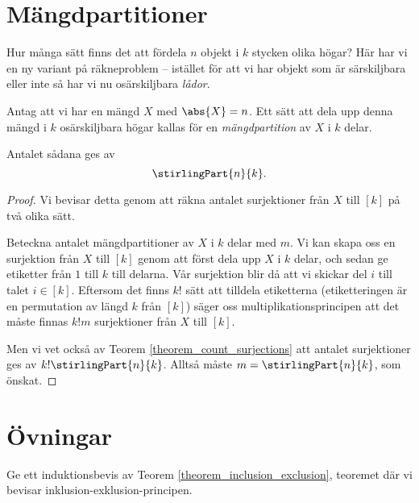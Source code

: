 \documentclass[nobib]{tufte-handout}
\begin{document}
\section{Mängdpartitioner}

Hur många sätt finns det att fördela $n$ objekt i $k$ stycken olika högar? Här har vi en ny variant på räkneproblem -- istället för att vi har objekt som är särskiljbara eller inte så har vi nu osärskiljbara \emph{lådor}.

\begin{theorem}
  Antag att vi har en mängd $X$ med $\abs{X} = n$. Ett sätt att dela upp denna mängd i $k$ osärskiljbara högar kallas för en \emph{mängdpartition} av $X$ i $k$ delar.

  Antalet sådana ges av
  $$\stirlingPart{n}{k}.$$

  \begin{proof}
    Vi bevisar detta genom att räkna antalet surjektioner från $X$ till $[k]$ på två olika sätt.

    Beteckna antalet mängdpartitioner av $X$ i $k$ delar med $m$. Vi kan skapa oss en surjektion från $X$ till $[k]$ genom att först dela upp $X$ i $k$ delar, och sedan ge etiketter från $1$ till $k$ till delarna. Vår surjektion blir då att vi skickar del $i$ till talet $i \in [k]$. Eftersom det finns $k!$ sätt att tilldela etiketterna (etiketteringen är en permutation av längd $k$ från $[k]$) säger oss multiplikationsprincipen att det måste finnas $k!m$ surjektioner från $X$ till $[k]$.

    Men vi vet också av Teorem \ref{theorem_count_surjections} att antalet surjektioner ges av $k!\stirlingPart{n}{k}$. Alltså måste $m = \stirlingPart{n}{k}$, som önskat.
  \end{proof}
\end{theorem}

\section{Övningar}

\begin{xca}
  Ge ett induktionsbevis av Teorem \ref{theorem_inclusion_exclusion}, teoremet där vi bevisar inklusion-exklusion-principen.
\end{xca}
\end{document}
